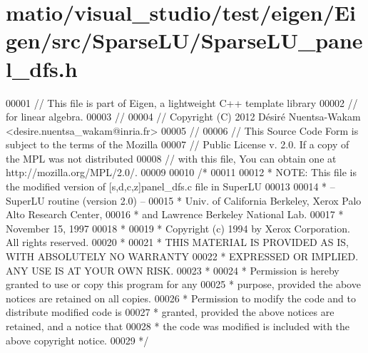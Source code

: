 \hypertarget{matio_2visual__studio_2test_2eigen_2_eigen_2src_2_sparse_l_u_2_sparse_l_u__panel__dfs_8h_source}{}\section{matio/visual\+\_\+studio/test/eigen/\+Eigen/src/\+Sparse\+L\+U/\+Sparse\+L\+U\+\_\+panel\+\_\+dfs.h}
\label{matio_2visual__studio_2test_2eigen_2_eigen_2src_2_sparse_l_u_2_sparse_l_u__panel__dfs_8h_source}

\begin{DoxyCode}
00001 \textcolor{comment}{// This file is part of Eigen, a lightweight C++ template library}
00002 \textcolor{comment}{// for linear algebra.}
00003 \textcolor{comment}{//}
00004 \textcolor{comment}{// Copyright (C) 2012 Désiré Nuentsa-Wakam <desire.nuentsa\_wakam@inria.fr>}
00005 \textcolor{comment}{//}
00006 \textcolor{comment}{// This Source Code Form is subject to the terms of the Mozilla}
00007 \textcolor{comment}{// Public License v. 2.0. If a copy of the MPL was not distributed}
00008 \textcolor{comment}{// with this file, You can obtain one at http://mozilla.org/MPL/2.0/.}
00009 
00010 \textcolor{comment}{/* }
00011 \textcolor{comment}{ }
00012 \textcolor{comment}{ * NOTE: This file is the modified version of [s,d,c,z]panel\_dfs.c file in SuperLU }
00013 \textcolor{comment}{ }
00014 \textcolor{comment}{ * -- SuperLU routine (version 2.0) --}
00015 \textcolor{comment}{ * Univ. of California Berkeley, Xerox Palo Alto Research Center,}
00016 \textcolor{comment}{ * and Lawrence Berkeley National Lab.}
00017 \textcolor{comment}{ * November 15, 1997}
00018 \textcolor{comment}{ *}
00019 \textcolor{comment}{ * Copyright (c) 1994 by Xerox Corporation.  All rights reserved.}
00020 \textcolor{comment}{ *}
00021 \textcolor{comment}{ * THIS MATERIAL IS PROVIDED AS IS, WITH ABSOLUTELY NO WARRANTY}
00022 \textcolor{comment}{ * EXPRESSED OR IMPLIED.  ANY USE IS AT YOUR OWN RISK.}
00023 \textcolor{comment}{ *}
00024 \textcolor{comment}{ * Permission is hereby granted to use or copy this program for any}
00025 \textcolor{comment}{ * purpose, provided the above notices are retained on all copies.}
00026 \textcolor{comment}{ * Permission to modify the code and to distribute modified code is}
00027 \textcolor{comment}{ * granted, provided the above notices are retained, and a notice that}
00028 \textcolor{comment}{ * the code was modified is included with the above copyright notice.}
00029 \textcolor{comment}{ */}

\end{DoxyCode}
